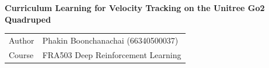 \documentclass[a4paper,11pt]{article}
\begin{document}
\begin{center}
\Large\textbf{Curriculum Learning for Velocity Tracking on the Unitree Go2 Quadruped}
\end{center}

\vspace{0.3cm}

\begin{tabular}{@{}ll}
Author  & Phakin Boonchanachai (66340500037) \\
Course  & FRA503 Deep Reinforcement Learning \\
\end{tabular}

\vspace{0.5cm}






\end{document}
